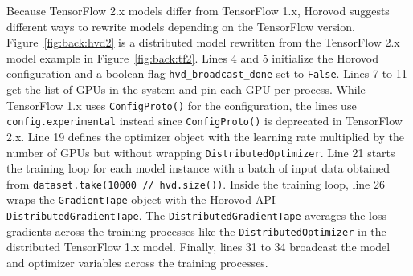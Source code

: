 Because TensorFlow 2.x models differ from TensorFlow 1.x, Horovod
suggests different ways to rewrite models depending on the TensorFlow version.
Figure~\ref{fig:back:hvd2} is a distributed model rewritten from the
TensorFlow 2.x model example in Figure~\ref{fig:back:tf2}.
Lines 4 and 5 initialize the Horovod configuration and a boolean flag
{\tt hvd\_broadcast\_done} set to {\tt False}.
Lines 7 to 11 get the list of GPUs in the system and pin each GPU per
process. 
While TensorFlow 1.x uses {\tt ConfigProto()} for the configuration, the lines
use {\tt config.experimental} instead since {\tt ConfigProto()} is deprecated
in TensorFlow 2.x.
Line 19 defines the optimizer object with the learning rate multiplied by
the number of GPUs but without wrapping {\tt DistributedOptimizer}.
Line 21 starts the training loop for each model instance with a batch of
input data obtained from {\tt dataset.take(10000 // hvd.size())}.
Inside the training loop,
line 26 wraps the {\tt GradientTape} object with the Horovod API  {\tt
DistributedGradientTape}.
The {\tt DistributedGradientTape} averages the loss gradients across the
training processes like the {\tt DistributedOptimizer} in the
distributed TensorFlow 1.x model.
Finally, lines 31 to 34 broadcast the model and optimizer variables
across the training processes.
